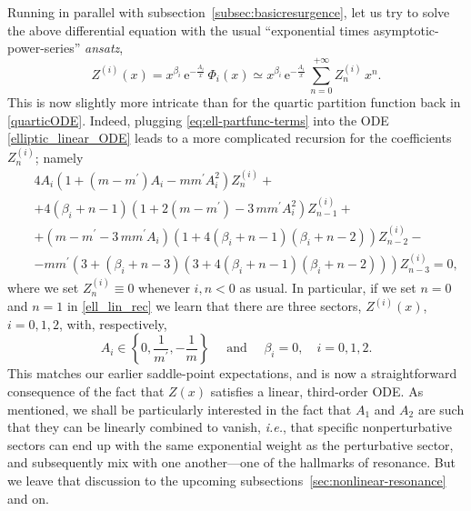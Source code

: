 \documentclass[11pt,a4paper]{article}
\newcommand{\be}{\begin{equation}}
\newcommand{\ee}{\end{equation}}
\newcommand{\bea}{\begin{eqnarray}}
\newcommand{\eea}{\end{eqnarray}}
\newcommand{\rme}{{\mathrm{e}}}
\begin{document}
Running in parallel with subsection~\ref{subsec:basicresurgence}, let us try to solve the above differential equation with the usual ``exponential times asymptotic-power-series'' \textit{ansatz},
%
\be
Z^{(i)} (x) = x^{\beta_i}\, \rme^{-\frac{A_i}{x}}\, \Phi_ i(x) \simeq x^{\beta_i}\,  \rme^{-\frac{A_i}{x}}\, \sum_{n=0}^{+\infty} Z^{(i)}_n\, x^{n}.
\label{eq:ell-partfunc-terms}
\ee
%
\noindent
This is now slightly more intricate than for the quartic partition function back in \eqref{quarticODE}. Indeed, plugging \eqref{eq:ell-partfunc-terms} into the ODE \eqref{elliptic_linear_ODE} leads to a more complicated recursion for the coefficients $Z^{(i)}_{n}$; namely
%
\bea
&&
4 A_i \left( 1 + \left( m-m^\prime \right) A_i - m m^\prime A_i^2 \right) Z^{(i)}_n + \nonumber \\
&&
+ 4 \left( \beta_i + n - 1 \right) \left( 1 + 2 \left( m-m^\prime \right) - 3\, m m^\prime A_i^2 \right) Z^{(i)}_{n-1} + \nonumber \\
&&
+ \left( m - m^\prime - 3\, m m^\prime A_i \right) \left( 1 + 4 \left( \beta_i + n - 1 \right) \left( \beta_i + n - 2 \right) \right) Z^{(i)}_{n-2} - \nonumber \\
&&
- m m^\prime \left( 3 + \left( \beta_i + n -3 \right) \left( 3 + 4 \left( \beta_i + n - 1 \right) \left( \beta_i + n - 2 \right) \right) \right) Z^{(i)}_{n-3} 
= 0,
\label{ell_lin_rec}
\eea
%
\noindent
where we set $Z^{(i)}_{n} \equiv 0$ whenever $i,n<0$ as usual. In particular, if we set $n=0$ and $n=1$ in \eqref{ell_lin_rec} we learn that there are three sectors, $Z^{(i)}(x)$, $i=0,1,2$, with, respectively,
%
\be
A_i \in \left\{ 0, \frac{1}{m^\prime}, -\frac{1}{m} \right\} \quad \text{ and } \quad \beta_i=0, \quad i=0,1,2.
\ee
%
\noindent
This matches our earlier saddle-point expectations, and is now a straightforward consequence of the fact that $Z(x)$ satisfies a linear, third-order ODE. As mentioned, we shall be particularly interested in the fact that $A_1$ and $A_2$ are such that they can be linearly combined to vanish, \textit{i.e.}, that specific nonperturbative sectors can end up with the same exponential weight as the perturbative sector, and subsequently mix with one another---one of the hallmarks of resonance. But we leave that discussion to the upcoming subsections~\ref{sec:nonlinear-resonance} and on.
\end{document}
